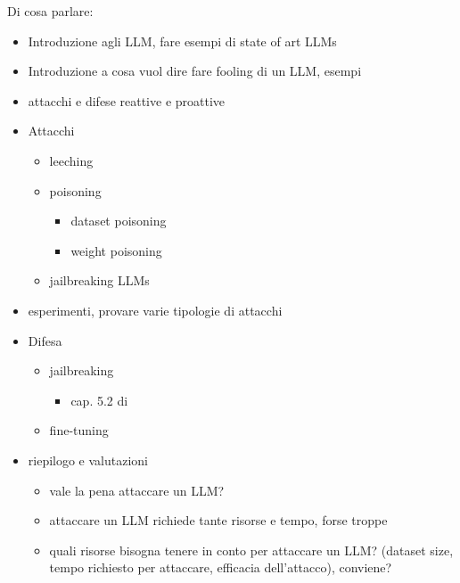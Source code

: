 Di cosa parlare:
\begin{itemize}
    \item Introduzione agli LLM, fare esempi di state of art LLMs
    \item Introduzione a cosa vuol dire fare fooling di un LLM, esempi
    \item attacchi e difese reattive e proattive
    \item Attacchi
    \begin{itemize}
        \item leeching
        \item poisoning
        \begin{itemize}
            \item dataset poisoning
            \item weight poisoning
        \end{itemize}
        \item jailbreaking LLMs
    \end{itemize}
    \item esperimenti, provare varie tipologie di attacchi
    \item Difesa
        \begin{itemize}
            \item jailbreaking
            \begin{itemize}
                \item cap. 5.2 di \cite{kumar2024adversarialattacksdefensesllm}
            \end{itemize}
            \item fine-tuning
        \end{itemize}
    \item riepilogo e valutazioni
        \begin{itemize}
            \item vale la pena attaccare un LLM?
            \item attaccare un LLM richiede tante risorse e tempo, forse troppe
            \item quali risorse bisogna tenere in conto per attaccare un LLM? (dataset size, tempo richiesto per attaccare, efficacia dell'attacco), conviene?
        \end{itemize}
\end{itemize}